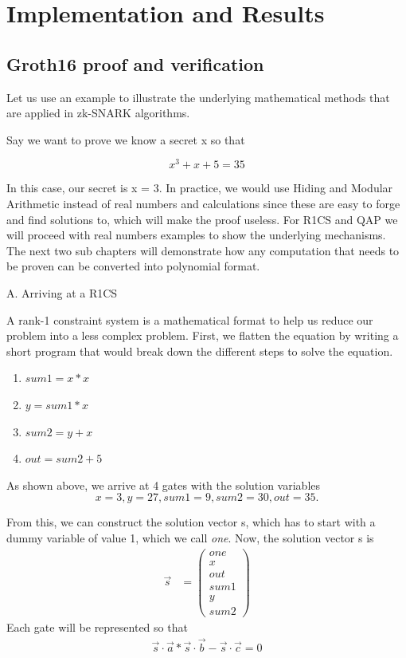 \chapter{Implementation and Results}
\section{Groth16 proof and verification}
Let us use an example to illustrate the underlying mathematical methods that are applied in zk-SNARK algorithms. 

Say we want to prove we know a secret x so that

\[x^3 + x + 5 = 35\]

In this case, our secret is x = 3.
In practice, we would use Hiding and Modular Arithmetic instead of real numbers and calculations since these are easy to forge and find solutions to, which will make the proof useless. For R1CS and QAP we will proceed with real numbers examples to show the underlying mechanisms. The next two sub chapters will demonstrate how any computation that needs to be proven can be converted into polynomial format.

A. Arriving at a R1CS

A rank-1 constraint system is a mathematical format to help us reduce our problem into a less complex problem. First, we flatten the equation by writing a short program that would break down the different steps to solve the equation.

\begin{enumerate}
    \item \(sum1 = x * x\)
    \item \(y = sum1 * x\)
    \item \(sum2 = y + x\)
    \item \(out = sum2 + 5\)
\end{enumerate}

As shown above, we arrive at 4 gates with the solution variables
\[x = 3, y = 27, sum1 = 9, sum2 = 30, out = 35.\]

From this, we can construct the solution vector s, which has to start with a dummy variable of value 1, which we call \textit{one}.
Now, the solution vector s is
\begin{align}
    \Vec{s} &= \begin{pmatrix}
     one \\ x \\ out \\ sum1 \\ y \\ sum2
\end{pmatrix}
\end{align}
Each gate will be represented so that
\begin{align}
     \Vec{s}\cdot\Vec{a} * \Vec{s}\cdot\Vec{b} - \Vec{s}\cdot\Vec{c} = 0
\end{align}

